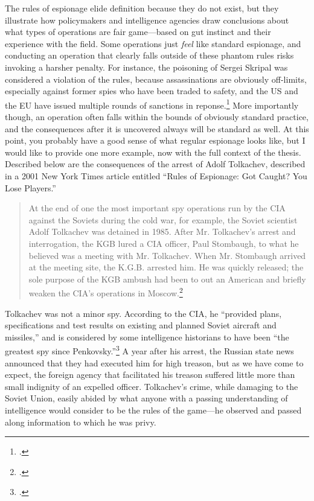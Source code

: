 \documentclass{report}
\begin{document}
The rules of espionage elide definition because they do not exist, but they illustrate how policymakers and intelligence agencies draw conclusions about what types of operations are fair game---based on gut instinct and their experience with the field. Some operations just \emph{feel} like standard espionage, and conducting an operation that clearly falls outside of these phantom rules risks invoking a harsher penalty. For instance, the poisoning of Sergei Skripal was considered a violation of the rules, because assassinations are obviously off-limits, especially against former spies who have been traded to safety, and the US and the EU have issued multiple rounds of sanctions in reponse.\footcite{reuters_e.u._2019} More importantly though, an operation often falls within the bounds of obviously standard practice, and the consequences after it is uncovered always will be standard as well. At this point, you probably have a good sense of what regular espionage looks like, but I would like to provide one more example, now with the full context of the thesis.  Described below are the consequences of the arrest of Adolf Tolkachev, described in a 2001 New York Times article entitled ``Rules of Espionage: Got Caught? You Lose Players.''

\begin{quote}
At the end of one the most important spy operations run by the CIA against the Soviets during the cold war, for example, the Soviet scientist Adolf Tolkachev was detained in 1985. After Mr. Tolkachev's arrest and interrogation, the KGB lured a CIA officer, Paul Stombaugh, to what he believed was a meeting with Mr. Tolkachev. When Mr. Stombaugh arrived at the meeting site, the K.G.B. arrested him. He was quickly released; the sole purpose of the KGB ambush had been to out an American and briefly weaken the CIA's operations in Moscow.\footcite{risen_rules_2001}
\end{quote}

Tolkachev was not a minor spy. According to the CIA, he ``provided plans, specifications and test results on existing and planned Soviet aircraft and missiles,'' and is considered by some intelligence historians to have been ``the greatest spy since Penkovsky.''\footcite{cia_look_2008} A year after his arrest, the Russian state news announced that they had executed him for high treason, but as we have come to expect, the foreign agency that facilitated his treason suffered little more than small indignity of an expelled officer. Tolkachev's crime, while damaging to the Soviet Union, easily abided by what anyone with a passing understanding of intelligence would consider to be the rules of the game---he observed and passed along information to which he was privy.
\end{document}

